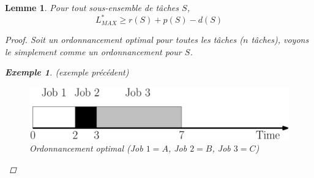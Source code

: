 \documentclass[12pt]{article}
\newtheorem{exemple}{Exemple}[section]
\newtheorem{lemme}{Lemme}[section]
\newtheorem{proof}{Preuve}[section]
\begin{document}
\begin{lemme} Pour tout sous-ensemble de tâches $S$,
$$ L^*_{MAX} \geq r(S) + p(S) - d(S) $$
\begin{proof}
Soit un ordonnancement optimal pour toutes les tâches ($n$ tâches), voyons le
simplement comme un ordonnancement pour $S$.

\begin{exemple} (exemple précédent)
\begin{figure}[h!]
    \begin{center}
    \includegraphics[scale=0.2]{ordo.pdf}
    \caption{Ordonnancement optimal \textit{(Job $1 = A$, Job $2 = B$,
    Job $3 = C$)}}
    \end{center}
\end{figure}


\end{exemple}
\end{proof}
\end{lemme}
\end{document}
